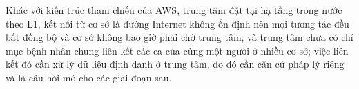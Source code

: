 Khác với kiến trúc tham chiếu của AWS, trung tâm đặt tại hạ tầng trong nước theo L1,
kết nối từ cơ sở là đường Internet không ổn định nên mọi tương tác đều bất đồng bộ và cơ
sở không bao giờ phải chờ trung tâm, và trung tâm chưa có chỉ mục bệnh nhân chung liên
kết các ca của cùng một người ở nhiều cơ sở; việc liên kết đó cần xử lý dữ liệu định
danh ở trung tâm, do đó cần căn cứ pháp lý riêng và là câu hỏi mở cho các giai đoạn sau.
